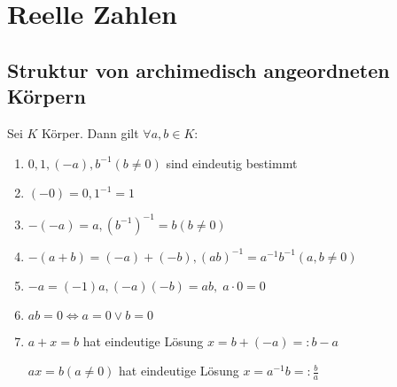 \section{Reelle Zahlen}
\subsection*{Struktur von archimedisch angeordneten Körpern}
\begin{proposition}
	Sei $K$ Körper. Dann gilt $\forall a,b\in K$:
	\begin{enumerate}[label={\arabic*)}]
		\item $0,1,(-a),b^{-1} (b\neq 0)$ sind eindeutig bestimmt
		\item $(-0) = 0, 1^{-1} = 1$
		\item $-(-a) = a, (b^{-1})^{-1} = b (b\neq 0)$
		\item $-(a+b) = (-a) + (-b), (ab)^{-1} = a^{-1}b^{-1} (a,b\neq 0)$
		\item $-a = (-1) a, (-a)(-b) = ab,\;a\cdot 0 = 0$
		\item $ab = 0 \Leftrightarrow a=0\lor b = 0$
		\item $a+x = b$ hat eindeutige Lösung $x = b+(-a) =: b-a$ 
		
		$ax=b (a\neq 0)$ hat eindeutige Lösung $x=a^{-1}b =:\frac{b}{a}$ 
	\end{enumerate}
\end{proposition}

